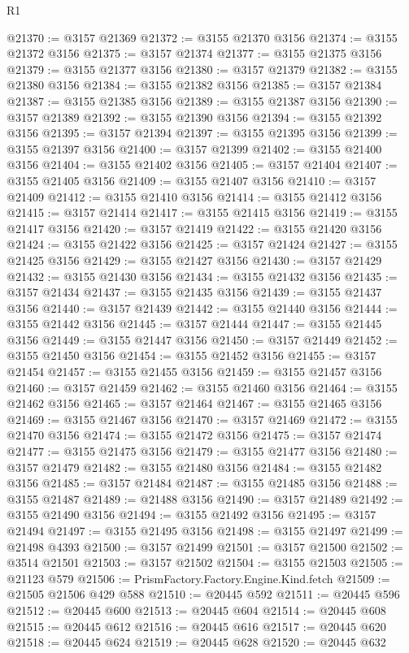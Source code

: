 \begin{lexlean}{R1}
\begin{coremodule}
@21370 := @3157 @21369
@21372 := @3155 @21370 @3156
@21374 := @3155 @21372 @3156
@21375 := @3157 @21374
@21377 := @3155 @21375 @3156
@21379 := @3155 @21377 @3156
@21380 := @3157 @21379
@21382 := @3155 @21380 @3156
@21384 := @3155 @21382 @3156
@21385 := @3157 @21384
@21387 := @3155 @21385 @3156
@21389 := @3155 @21387 @3156
@21390 := @3157 @21389
@21392 := @3155 @21390 @3156
@21394 := @3155 @21392 @3156
@21395 := @3157 @21394
@21397 := @3155 @21395 @3156
@21399 := @3155 @21397 @3156
@21400 := @3157 @21399
@21402 := @3155 @21400 @3156
@21404 := @3155 @21402 @3156
@21405 := @3157 @21404
@21407 := @3155 @21405 @3156
@21409 := @3155 @21407 @3156
@21410 := @3157 @21409
@21412 := @3155 @21410 @3156
@21414 := @3155 @21412 @3156
@21415 := @3157 @21414
@21417 := @3155 @21415 @3156
@21419 := @3155 @21417 @3156
@21420 := @3157 @21419
@21422 := @3155 @21420 @3156
@21424 := @3155 @21422 @3156
@21425 := @3157 @21424
@21427 := @3155 @21425 @3156
@21429 := @3155 @21427 @3156
@21430 := @3157 @21429
@21432 := @3155 @21430 @3156
@21434 := @3155 @21432 @3156
@21435 := @3157 @21434
@21437 := @3155 @21435 @3156
@21439 := @3155 @21437 @3156
@21440 := @3157 @21439
@21442 := @3155 @21440 @3156
@21444 := @3155 @21442 @3156
@21445 := @3157 @21444
@21447 := @3155 @21445 @3156
@21449 := @3155 @21447 @3156
@21450 := @3157 @21449
@21452 := @3155 @21450 @3156
@21454 := @3155 @21452 @3156
@21455 := @3157 @21454
@21457 := @3155 @21455 @3156
@21459 := @3155 @21457 @3156
@21460 := @3157 @21459
@21462 := @3155 @21460 @3156
@21464 := @3155 @21462 @3156
@21465 := @3157 @21464
@21467 := @3155 @21465 @3156
@21469 := @3155 @21467 @3156
@21470 := @3157 @21469
@21472 := @3155 @21470 @3156
@21474 := @3155 @21472 @3156
@21475 := @3157 @21474
@21477 := @3155 @21475 @3156
@21479 := @3155 @21477 @3156
@21480 := @3157 @21479
@21482 := @3155 @21480 @3156
@21484 := @3155 @21482 @3156
@21485 := @3157 @21484
@21487 := @3155 @21485 @3156
@21488 := @3155 @21487
@21489 := @21488 @3156
@21490 := @3157 @21489
@21492 := @3155 @21490 @3156
@21494 := @3155 @21492 @3156
@21495 := @3157 @21494
@21497 := @3155 @21495 @3156
@21498 := @3155 @21497
@21499 := @21498 @4393
@21500 := @3157 @21499
@21501 := @3157 @21500
@21502 := @3514 @21501
@21503 := @3157 @21502
@21504 := @3155 @21503
@21505 := @21123 @579
@21506 := PrismFactory.Factory.Engine.Kind.fetch
@21509 := @21505 @21506 @429 @588
@21510 := @20445 @592
@21511 := @20445 @596
@21512 := @20445 @600
@21513 := @20445 @604
@21514 := @20445 @608
@21515 := @20445 @612
@21516 := @20445 @616
@21517 := @20445 @620
@21518 := @20445 @624
@21519 := @20445 @628
@21520 := @20445 @632

\end{coremodule}
\end{lexlean}
